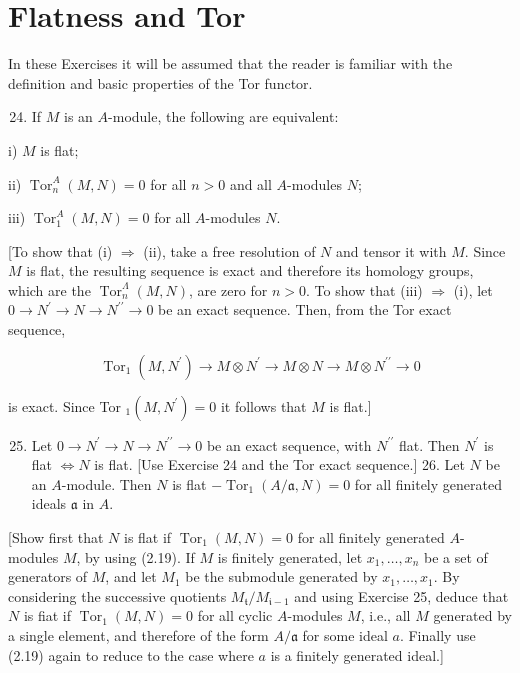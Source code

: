 \documentclass{standalone}
\theoremstyle{definition}
\theoremstyle{remark}
\begin{document}
\section{Flatness and Tor}
In these Exercises it will be assumed that the reader is familiar with the definition and basic properties of the Tor functor.

\begin{enumerate}
  \setcounter{enumi}{23}
  \item If $M$ is an $A$-module, the following are equivalent:
\end{enumerate}

i) $M$ is flat;

ii) $\operatorname{Tor}_{n}^{A}(M, N)=0$ for all $n>0$ and all $A$-modules $N$;

iii) $\operatorname{Tor}_{1}^{A}(M, N)=0$ for all $A$-modules $N$.

[To show that (i) $\Rightarrow$ (ii), take a free resolution of $N$ and tensor it with $M$. Since $M$ is flat, the resulting sequence is exact and therefore its homology groups, which are the $\operatorname{Tor}_{n}^{\Lambda}(M, N)$, are zero for $n>0$. To show that (iii) $\Rightarrow$ (i), let $0 \rightarrow N^{\prime} \rightarrow N \rightarrow N^{\prime \prime} \rightarrow 0$ be an exact sequence. Then, from the Tor exact sequence,

\[
\operatorname{Tor}_{1}\left(M, N^{\prime}\right) \rightarrow M \otimes N^{\prime} \rightarrow M \otimes N \rightarrow M \otimes N^{\prime \prime} \rightarrow 0
\]

is exact. Since Tor $_{1}\left(M, N^{\prime}\right)=0$ it follows that $M$ is flat.]

\begin{enumerate}
  \setcounter{enumi}{24}
  \item Let $0 \rightarrow N^{\prime} \rightarrow N \rightarrow N^{\prime \prime} \rightarrow 0$ be an exact sequence, with $N^{\prime \prime}$ flat. Then $N^{\prime}$ is flat $\Leftrightarrow N$ is flat. [Use Exercise 24 and the Tor exact sequence.] 26. Let $N$ be an $A$-module. Then $N$ is flat $-\operatorname{Tor}_{1}(A / \mathfrak{a}, N)=0$ for all finitely generated ideals $\mathfrak{a}$ in $A$.
\end{enumerate}

[Show first that $N$ is flat if $\operatorname{Tor}_{1}(M, N)=0$ for all finitely generated $A$-modules $M$, by using (2.19). If $M$ is finitely generated, let $x_{1}, \ldots, x_{n}$ be a set of generators of $M$, and let $M_{1}$ be the submodule generated by $x_{1}, \ldots, x_{1}$. By considering the successive quotients $M_{\mathfrak{t}} / M_{\mathfrak{i}-1}$ and using Exercise 25, deduce that $N$ is fiat if $\operatorname{Tor}_{1}(M, N)=0$ for all cyclic $A$-modules $M$, i.e., all $M$ generated by a single element, and therefore of the form $A / \mathfrak{a}$ for some ideal $a$. Finally use (2.19) again to reduce to the case where $a$ is a finitely generated ideal.]
\end{document}
